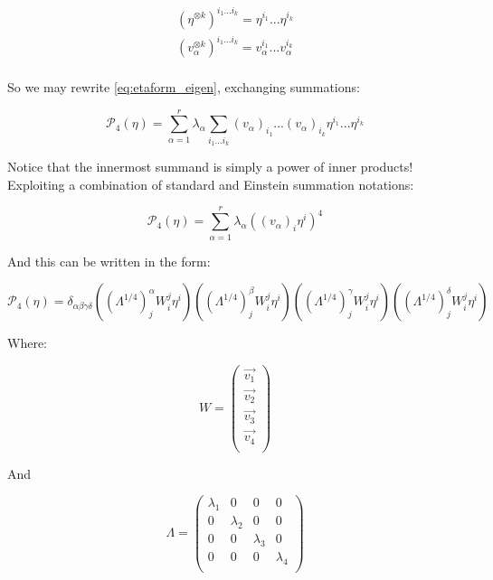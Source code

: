 \documentclass[10pt,letterpaper]{article}
\begin{document}
\begin{gather*}
\left(\eta^{\otimes k}\right)^{i_1...i_k} = \eta^{i_1}...\eta^{i_k} \\ 
\left(v_{\alpha}^{\otimes k}\right)^{i_1...i_k} = v_{\alpha}^{i_1}...v_{\alpha}^{i_k} \\
\end{gather*}

So we may rewrite \ref{eq:etaform_eigen}, exchanging summations:

\begin{equation} \label{eq:etaform_eigen}
\mathcal{P}_4(\eta) =  \sum_{\alpha=1}^r \lambda_{\alpha} \sum_{i_1...i_k} \left(v_{\alpha}\right)_{i_1}...\left(v_{\alpha}\right)_{i_k} \eta^{i_1}...\eta^{i_k}
\end{equation}

Notice that the innermost summand is simply a power of inner products!
Exploiting a combination of standard and Einstein summation notations:


\begin{equation} \label{eq:etaform_eigen_niii}
\mathcal{P}_4(\eta) =  \sum_{\alpha=1}^r \lambda_{\alpha} \left(\left(v_{\alpha}\right)_i\eta^i\right)^4
\end{equation}

And this can be written in the form:

\begin{equation} \label{eq:etaform_eigen_niii}
\mathcal{P}_4(\eta) =  \delta_{\alpha \beta \gamma \delta} \left(\left(\Lambda^{1/4}\right)^{\alpha}_{j} W^{j}_i\eta^i\right)\left(\left(\Lambda^{1/4}\right)^{\beta}_{j} W^{j}_i\eta^i\right)\left(\left(\Lambda^{1/4}\right)^{\gamma}_{j} W^{j}_i\eta^i\right)\left(\left(\Lambda^{1/4}\right)^{\delta}_{j} W^{j}_i\eta^i\right)
\end{equation}

Where:

\[W = \left(\begin{array}{c}
\vec{v_1} \\
\vec{v_2} \\
\vec{v_3} \\
\vec{v_4} \\
\end{array} \right)\] 

And

\[\Lambda = \left(\begin{array}{cccc}
\lambda_1 & 0 & 0 & 0 \\
0 & \lambda_2 & 0 & 0 \\
0 & 0 &\lambda_3 & 0 \\
0 & 0 & 0 & \lambda_4 \\
\end{array} \right)\] 
\end{document}
